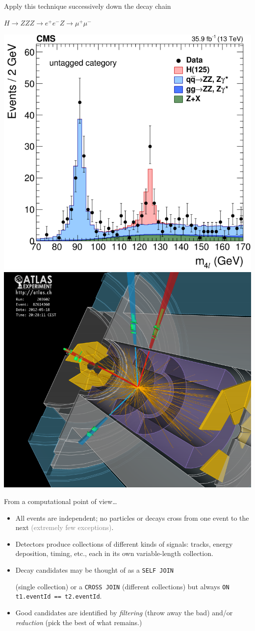 \documentclass[aspectratio=169]{beamer}
\begin{document}
\begin{frame}{Apply this technique successively down the decay chain}
\Large
\begin{center}
$H \to ZZ$\hspace{1 cm}$Z \to e^+e^-$\hspace{1 cm}$Z \to \mu^+\mu^-$
\end{center}

\includegraphics[height=6 cm]{higgs-to-four-leptons.png}\hfill\includegraphics[height=6 cm]{higgs-to-four-leptons-2.png}
\end{frame}

\begin{frame}{From a computational point of view\ldots}
\Large
\vspace{0.25 cm}
\begin{itemize}\setlength{\itemsep}{0.25 cm}
\item All events are independent; no particles or decays cross from one event to the next \textcolor{gray}{(extremely few exceptions)}.
\item Detectors produce collections of different kinds of signals: tracks, energy deposition, timing, etc., each in its own variable-length collection.
\item Decay candidates may be thought of as a \texttt{SELF JOIN}

(single collection) or a \texttt{CROSS JOIN} (different collections) but always \texttt{ON t1.eventId == t2.eventId}.
\item Good candidates are identified by {\it filtering} (throw away the bad) and/or {\it reduction} (pick the best of what remains.)
\end{itemize}
\end{frame}
\end{document}
